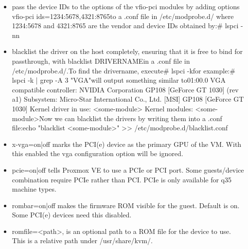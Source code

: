 \begin{itemize}[leftmargin=2cm]

	\item pass the device IDs to the options of the vfio-pci modules by adding options vfio-pci ids=1234:5678,4321:8765to a .conf file in /etc/modprobe.d/ where 1234:5678 and 4321:8765 are the vendor and device IDs obtained by:# lspci -nn

	\item blacklist the driver on the host completely, ensuring that it is free to bind for passthrough, with blacklist DRIVERNAMEin a .conf file in /etc/modprobe.d/.To find the drivername, execute# lspci -kfor example:# lspci -k | grep -A 3 "VGA"will output something similar to01:00.0 VGA compatible controller: NVIDIA Corporation GP108 [GeForce GT 1030] (rev a1) Subsystem: Micro-Star International Co., Ltd. [MSI] GP108 [GeForce GT 1030] Kernel driver in use: <some-module> Kernel modules: <some-module>Now we can blacklist the drivers by writing them into a .conf file:echo "blacklist <some-module>" >> /etc/modprobe.d/blacklist.conf

\end{itemize}

\begin{itemize}[leftmargin=2cm]

	\item x-vga=on|off marks the PCI(e) device as the primary GPU of the VM. With this enabled the vga configuration option will be ignored.

	\item pcie=on|off tells Proxmox VE to use a PCIe or PCI port. Some guests/device combination require PCIe rather than PCI. PCIe is only available for q35 machine types.

	\item rombar=on|off makes the firmware ROM visible for the guest. Default is on. Some PCI(e) devices need this disabled.

	\item romfile=<path>, is an optional path to a ROM file for the device to use. This is a relative path under /usr/share/kvm/.

\end{itemize}

